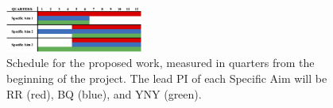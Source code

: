 \begin{figure}
  \includegraphics[width=0.4\textwidth]{figures/gantt.jpg}
  \caption{\label{fig:schedule} Schedule for the proposed work, measured
  in quarters from the beginning of the project. The lead PI of each
  Specific Aim will be RR (red), BQ (blue), and YNY (green).}
\end{figure}

